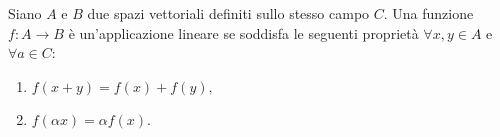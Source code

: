 \begin{definition}\label{def:applicazione_lineare}
	Siano $A$ e $B$ due spazi vettoriali definiti sullo stesso campo $C$. Una funzione $f:A\rightarrow B$ è un'\gls{applicazione lineare} se soddisfa le seguenti proprietà $\forall x,y\in A$ e $\forall a\in C$:
	\begin{enumerate}
		\item $f(x+y)=f(x)+f(y),$
		\item $f(\alpha x)=\alpha f(x)$.
	\end{enumerate}
\end{definition}